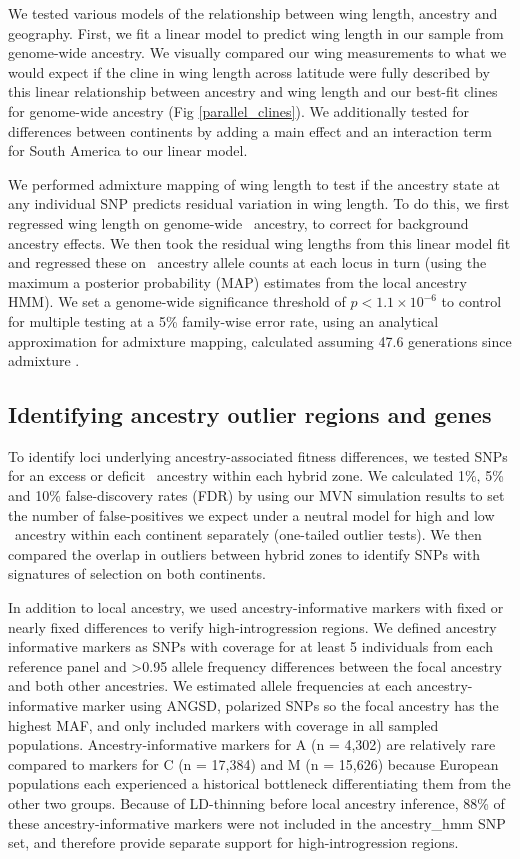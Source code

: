 We tested various models of the relationship between wing length,  ancestry and geography. First, we fit a linear model to predict wing length in our sample from genome-wide ancestry. We visually compared our wing measurements to what we would expect if the cline in wing length across latitude were fully described by this linear relationship between ancestry and wing length and our best-fit clines for genome-wide ancestry (Fig \ref{parallel_clines}). We additionally tested for differences between continents by adding a main effect and an interaction term for South America to our linear model.

We performed admixture mapping of wing length to test if the ancestry state at any individual SNP predicts residual variation in wing length. To do this, we first regressed wing length on genome-wide \A\ ancestry, to correct for background ancestry effects. We then took the residual wing lengths from this linear model fit and regressed these on \A\ ancestry allele counts at each locus in turn (using the maximum a posterior probability (MAP) estimates from the local ancestry HMM). We set a genome-wide significance threshold of $p<1.1\times10^{-6}$ to control for multiple testing at a 5\% family-wise error rate, using an analytical approximation for admixture mapping, calculated assuming 47.6 generations since admixture \cite{Grinde:2019bi, Siegmund:2007vx}.

\subsection*{Identifying ancestry outlier regions and genes}
To identify loci underlying ancestry-associated fitness differences, we tested SNPs for an excess or deficit \A\ ancestry within each hybrid zone. We calculated 1\%, 5\% and 10\% false-discovery rates (FDR) by using our MVN simulation results to set the number of false-positives we expect under a neutral model for high and low \A\ ancestry within each continent separately (one-tailed outlier tests). We then compared the overlap in outliers between hybrid zones to identify SNPs with signatures of selection on both continents.

In addition to local ancestry, we used ancestry-informative markers with fixed or nearly fixed differences to verify high-introgression regions. We defined ancestry informative markers as SNPs with coverage for at least 5 individuals from each reference panel and \textgreater0.95 allele frequency differences between the focal ancestry and both other ancestries. We estimated allele frequencies at each ancestry-informative marker using ANGSD, polarized SNPs so the focal ancestry has the highest MAF, and only included markers with coverage in all sampled populations. Ancestry-informative markers for A (n = 4,302) are relatively rare compared to markers for C (n = 17,384) and M (n = 15,626) because European populations each experienced a historical bottleneck differentiating them from the other two groups. Because of LD-thinning before local ancestry inference, 88\% of these ancestry-informative markers were not included in the ancestry\_hmm SNP set, and therefore provide separate support for high-introgression regions.

